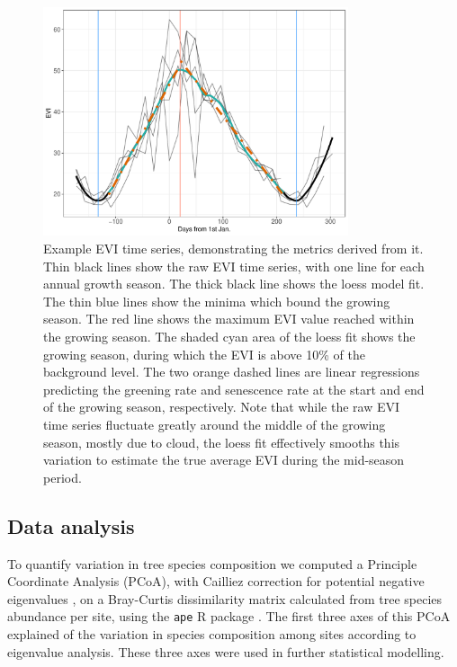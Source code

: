 \documentclass[11pt,a4paper]{article}
\begin{document}
\begin{figure}[H]
\centering
	\includegraphics[width=0.8\textwidth]{ts_example}
	\caption{Example EVI time series, demonstrating the metrics derived from it. Thin black lines show the raw EVI time series, with one line for each annual growth season. The thick black line shows the loess model fit. The thin blue lines show the minima which bound the growing season. The red line shows the maximum EVI value reached within the growing season. The shaded cyan area of the loess fit shows the growing season, during which the EVI is above 10\% of the background level. The two orange dashed lines are linear regressions predicting the greening rate and senescence rate at the start and end of the growing season, respectively. Note that while the raw EVI time series fluctuate greatly around the middle of the growing season, mostly due to cloud, the loess fit effectively smooths this variation to estimate the true average EVI during the mid-season period.}
	\label{ts_example}
\end{figure}


\subsection{Data analysis}

To quantify variation in tree species composition we computed a Principle Coordinate Analysis (PCoA), with Cailliez correction for potential negative eigenvalues \citep{Legendre1998}, on a Bray-Curtis dissimilarity matrix calculated from tree species abundance per site, using the \texttt{ape} R package \citep{ape2019}. The first three axes of this PCoA explained \pcoaPer{} of the variation in species composition among sites according to eigenvalue analysis. These three axes were used in further statistical modelling.
\end{document}

